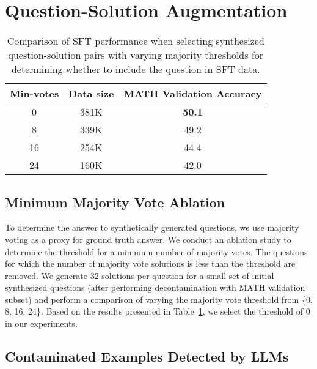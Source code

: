 

\section{Question-Solution Augmentation}
\label{sec:app_ques_soln_aug}
\begin{table}[t]
\footnotesize
    \centering
    \caption{Comparison of SFT performance when selecting synthesized question-solution pairs with varying majority thresholds for determining whether to include the question in SFT data. }
    \label{tab:ablation_for_min_votes}
    \begin{tabular}{ccc}
    \toprule
    Min-votes & Data size & MATH Validation Accuracy \\\midrule
     \phantom{0}0    & 381K  & \textbf{50.1} \\
     \phantom{0}8    & 339K  & 49.2 \\
     16              & 254K  & 44.4 \\
     24              & 160K  & 42.0 \\\bottomrule
    \end{tabular}
\end{table}






\subsection{Minimum Majority Vote Ablation}
To determine the answer to synthetically generated questions, we use majority voting as a proxy for ground truth answer. 
We conduct an ablation study to determine the threshold for a minimum number of majority votes. 
The questions for which the number of majority vote solutions is less than the threshold are removed. 
We generate 32 solutions per question for a small set of initial synthesized questions (after performing decontamination with MATH validation subset) and perform a comparison of varying the majority vote threshold from \{0, 8, 16, 24\}. 
Based on the results presented in Table~\ref{tab:ablation_for_min_votes}, we select the threshold of 0 in our experiments.   









\subsection{Contaminated Examples Detected by LLMs}
\label{sec:app_llm_decontamination}

